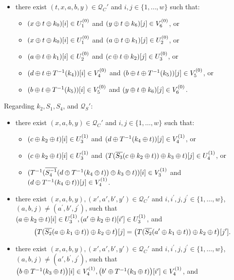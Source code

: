 \begin{definition}
\begin{itemize}[leftmargin=10mm]
\begin{itemize}
		\end{itemize}
		\item[\cthree] there exist $(t,x,a,b,y) \in \mathcal{Q}_{C}'$ and $i, j \in \{1, \ldots, w\}$ such that:
		\begin{itemize}
			\item $(x\oplus t\oplus k_0)[i]\in U_1^{(0)}$ and $(y\oplus t\oplus k_6)[j]\in V_6^{(0)}$, or
			\item $(x\oplus t\oplus k_0)[i]\in U_1^{(0)}$ and $(a\oplus t \oplus k_1)[j]\in U_{2}^{(0)}$, or
			\item $(a\oplus t \oplus k_1)[i]\in U_{2}^{(0)}$ and $(c\oplus t \oplus k_2)[j]\in U_{3}^{(0)}$, or
			\item $(d\oplus t\oplus T^{-1}(k_4))[i]\in V_4^{(0)}$ and
			$(b\oplus t\oplus T^{-1}(k_5))[j]\in V_5^{(0)}$, or
			\item $(b\oplus t\oplus T^{-1}(k_5))[i]\in V_5^{(0)}$ and
			$(y\oplus t\oplus k_6)[j]\in V_6^{(0)}$.
		\end{itemize}
	\end{itemize}
	Regarding $k_2,S_1,S_4$, and $\mathcal{Q}_S'$:
	\begin{itemize}[leftmargin=10mm]
		\item[\cfour] there exist $(x,a,b,y) \in \mathcal{Q}_{C}'$ and $i, j \in\{1, \ldots, w\}$ such that:
		\begin{itemize}
			\item $(c\oplus k_2\oplus t)[i]\in U_3^{(1)}$ and $(d\oplus T^{-1}(k_4\oplus t))[j]\in V_4^{(1)}$, or
			\item $(c\oplus k_2\oplus t)[i]\in U_3^{(1)}$ and $(T(\overline{S_3}(c\oplus k_2\oplus t))\oplus k_3\oplus t)[j]\in U_4^{(1)}$, or
			\item $(T^{-1}(\overline{S_4^{-1}}(d\oplus T^{-1}(k_4\oplus t))\oplus k_3\oplus t))[i]\in V_3^{(1)}$ and $(d\oplus T^{-1}(k_4\oplus t))[j]\in V_4^{(1)}$.
		\end{itemize}
		\item[\cfive] there exist $(x,a,b,y),(x',a',b',y') \in \mathcal{Q}_{C}'$ and $i, i^{\prime},j, j^{\prime} \in\{1, \ldots, w\}$, $(a,b, j) \neq \left(a^{\prime}, b',j^{\prime}\right)$, such that $(a \oplus k_2\oplus t)[i]\in U_3^{(1)}, (a' \oplus k_2\oplus t)[i']\in U_3^{(1)}$, and
		$$\big(T(\overline{S_2}(a\oplus k_1\oplus t))\oplus k_2\oplus t\big)[j]=\big(T(\overline{S_2}(a'\oplus k_1\oplus t))\oplus k_2\oplus t\big)[j'].
		$$
		\item[\csix] there exist $(x,a,b,y),(x',a',b',y') \in \mathcal{Q}_{C}'$ and $i, i^{\prime}, j, j^{\prime} \in\{1, \ldots, w\}$, $(a,b, j) \neq \left(a',b^{\prime}, j^{\prime}\right)$, such that $\big(b \oplus T^{-1}(k_3\oplus t)\big)[i]\in V_4^{(1)}, \big(b' \oplus T^{-1}(k_3\oplus t)\big)[i']\in V_4^{(1)}$, and         {\small
}
\end{itemize}
\end{definition}

